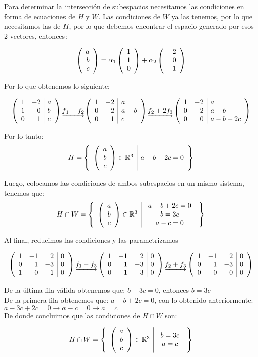 \begin{sol}
Para determinar la intersección de subespacios necesitamos las condiciones en forma de ecuaciones de $H$ y $W$. Las condiciones de $W$ ya las tenemos, por lo que necesitamos las de $H$, por lo que debemos encontrar el espacio generado por esos 2 vectores, entonces:

$$\vectrtres{a}{b}{c} = \alpha_1 \vectrtres{1}{1}{0}+ \alpha_2 \vectrtres{-2}{0}{1}$$

Por lo que obtenemos lo siguiente:

$$\reducir{rr|l}{1&-2&a\\1&0&b\\0&1&c} 
\underrightarrow{f_1 - f_2}
\reducir{rr|l}{1&-2&a\\0&-2&a-b\\0&1&c}
\underrightarrow{f_2 + 2f_3} 
\reducir{rr|l}{1&-2&a\\0&-2&a-b\\0&0&a-b+2c}$$

Por lo tanto:
$$\svrtres{H}{a}{b}{c}{a-b+2c=0}$$

Luego, colocamos las condiciones de ambos subespacios en un mismo sistema, tenemos que:
$$\svrtres{H \cap W}{a}{b}{c}{\begin{array}{c}
    a-b+2c=0  \\
    b=3c\\
    a-c=0
\end{array}}$$

Al final, reducimos las condiciones y las parametrizamos

$$\reducir{rrr|c}{1&-1&2&0\\0&1&-3&0\\1&0&-1&0}
\underrightarrow{f_1 - f_3}
\reducir{rrr|c}{1&-1&2&0\\0&1&-3&0\\0&-1&3&0}
\underrightarrow{f_2 + f_3}
\reducir{rrr|c}{1&-1&2&0\\0&1&-3&0\\0&0&0&0}$$

De la última fila válida obtenemos que: $b - 3c = 0$, entonces $b = 3c$\\
De la primera fila obtenemos que: $a-b+2c = 0$, con lo obtenido anteriormente: $a-3c +2c = 0 \longrightarrow a-c = 0 \longrightarrow a= c$\\

De donde concluimos que las condiciones de $H \cap W$ son:

$$\svrtres{H \cap W}{a}{b}{c}{\begin{array}{c}
    b=3c\\
    a=c
\end{array}}$$
\end{sol}

